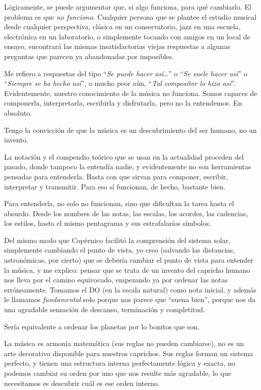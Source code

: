 \documentclass[]{article}
\begin{document}
Lógicamente, se puede argumentar que, si algo funciona, para qué cambiarlo. El problema es que \emph{no funciona}. Cualquier persona que se plantee el estudio musical desde cualquier perspectiva, clásica en un conservatorio, jazz en una escuela, electrónica en un laboratorio, o simplemente tocando con amigos en un local de ensayo, encontrará las mismas insatisfactorias viejas respuestas a algunas preguntas que parecen ya abandonadas por imposibles.

Me refiero a respuestas del tipo ``\emph{Se puede hacer   así\ldots{}}'' o ``\emph{Se suele hacer así}'' o ``\emph{Siempre se ha   hecho así}'', o mucho peor aún, ``\emph{Tal compositor lo hizo así}''. Evidentemente, nuestro conocimiento de la música no funciona. Somos capaces de componerla, interpretarla, escribirla y disfrutarla, pero no la entendemos. En absoluto.

Tengo la convicción de que la música es un descubrimiento del ser humano, no un invento.

La notación y el compendio teórico que se usan en la actualidad proceden del pasado, donde tampoco la entendía nadie, y evidentemente no son herramientas pensadas para entenderla. Basta con que sirvan para componer, escribir, interpretar y transmitir. Para eso sí funcionan, de hecho, bastante bien.

Para entenderla, no solo no funcionan, sino que dificultan la tarea hasta el absurdo. Desde los nombres de las notas, las escalas, los acordes, las cadencias, los estilos, hasta el mismo pentagrama y sus estrafalarios símbolos.

Del mismo modo que Copérnico facilitó la comprensión del sistema solar, simplemente cambiando el punto de vista, yo creo (salvando las distancias, astronómicas, por cierto) que se debería cambiar el punto de vista para entender la música, y me explico: pensar que se trata de un invento del capricho humano nos lleva por el camino equivocado, empezando ya por ordenar las notas erróneamente. Tomamos el DO (en la escala natural) como nota inicial, y además le llamamos \emph{fundamental} solo porque nos parece que ``suena bien'', porque nos da una agradable sensación de descanso, terminación y completitud.

Sería equivalente a ordenar los planetas por lo bonitos que son.

La música es armonía matemática (sus reglas no pueden cambiarse), no es un arte decorativo disponible para nuestros caprichos. Sus reglas forman un sistema perfecto, y tienen una estructura interna perfectamente lógica y exacta, no podemos cambiar su orden por uno que nos resulte más agradable, lo que necesitamos es descubrir cuál es ese orden interno.
\end{document}
